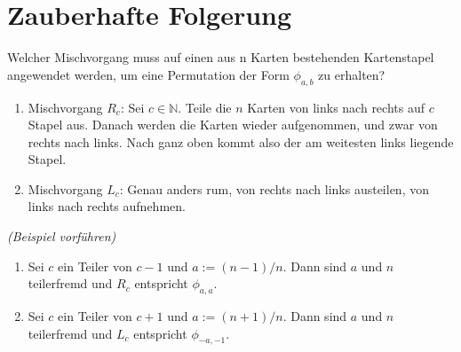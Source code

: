 \documentclass[a4paper]{article}
\begin{document}
    \section{Zauberhafte Folgerung}
    Welcher Mischvorgang muss auf einen aus n Karten bestehenden Kartenstapel angewendet werden, um eine Permutation der Form $\phi_{a,b}$ zu erhalten? 
    \begin{enumerate}
    \item Mischvorgang $R_c$: Sei $c \in \mathbb{N}$. Teile die $n$ Karten von links nach rechts auf $c$ Stapel aus. Danach werden die Karten wieder aufgenommen, und zwar von rechts nach links. Nach ganz oben kommt also der am weitesten links liegende Stapel.
    \item Mischvorgang $L_c$: Genau anders rum, von rechts nach links austeilen, von links nach rechts aufnehmen.
    \end{enumerate}
    \textit{(Beispiel vorführen)}
    \begin{definition} 
    \begin{enumerate}
    \item Sei $c$ ein Teiler von $c - 1$ und $a := (n - 1)/n$. Dann sind $a$ und $n$ teilerfremd und $R_c$ entspricht $\phi_{a,a}$.
    \item Sei $c$ ein Teiler von $c + 1$ und $a := (n + 1)/n$. Dann sind $a$ und $n$ teilerfremd und $L_c$ entspricht $\phi_{-a,-1}$.
    \end{enumerate}
    \end{definition}
    \vspace{2mm}
    \begin{beweis}
    
    \end {beweis}
\end{document}
